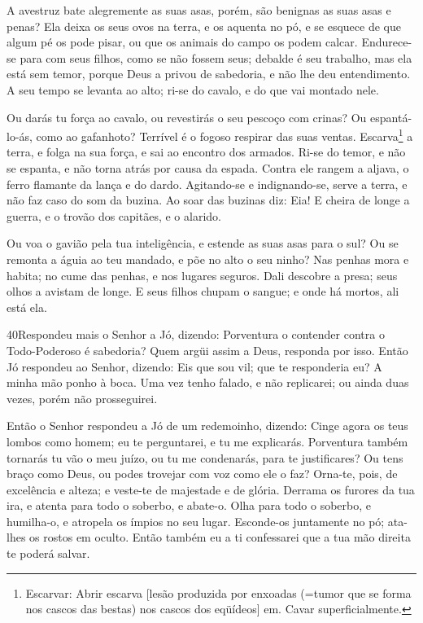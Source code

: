 A avestruz bate alegremente as suas asas, porém, são benignas as
suas asas e penas? Ela deixa os seus ovos na terra, e os
aquenta no pó, e se esquece de que algum pé os pode pisar, ou
que os animais do campo os podem calcar. Endurece-se para com
seus filhos, como se não fossem seus; debalde é seu trabalho, mas
ela está sem temor, porque Deus a privou de sabedoria, e não
lhe deu entendimento. A seu tempo se levanta ao alto; ri-se
do cavalo, e do que vai montado nele.

Ou darás tu força ao cavalo, ou revestirás o seu pescoço com
crinas? Ou espantá-lo-ás, como ao gafanhoto? Terrível é o
fogoso respirar das suas ventas. Escarva\footnote{Escarvar:
Abrir escarva [lesão produzida por enxoadas (=tumor que se forma nos
cascos das bestas) nos cascos dos eqüídeos] em. Cavar
superficialmente.} a terra, e folga na sua força, e sai ao encontro
dos armados. Ri-se do temor, e não se espanta, e não torna
atrás por causa da espada. Contra ele rangem a aljava, o
ferro flamante da lança e do dardo. Agitando-se e
indignando-se, serve a terra, e não faz caso do som da buzina.
Ao soar das buzinas diz: Eia! E cheira de longe a guerra, e o
trovão dos capitães, e o alarido.

Ou voa o gavião pela tua inteligência, e estende as suas asas
para o sul? Ou se remonta a águia ao teu mandado, e põe no
alto o seu ninho? Nas penhas mora e habita; no cume das
penhas, e nos lugares seguros. Dali descobre a presa; seus
olhos a avistam de longe. E seus filhos chupam o sangue; e
onde há mortos, ali está ela.

\medskip

\lettrine{40} Respondeu mais o Senhor a Jó, dizendo:
Porventura o contender contra o Todo-Poderoso é sabedoria? Quem
argüi assim a Deus, responda por isso. Então Jó respondeu ao
Senhor, dizendo: Eis que sou vil; que te responderia eu? A minha
mão ponho à boca. Uma vez tenho falado, e não replicarei; ou
ainda duas vezes, porém não prosseguirei.

Então o Senhor respondeu a Jó de um redemoinho, dizendo: Cinge
agora os teus lombos como homem; eu te perguntarei, e tu me
explicarás. Porventura também tornarás tu vão o meu juízo, ou tu
me condenarás, para te justificares? Ou tens braço como Deus, ou
podes trovejar com voz como ele o faz? Orna-te, pois, de
excelência e alteza; e veste-te de majestade e de glória.
Derrama os furores da tua ira, e atenta para todo o soberbo,
e abate-o. Olha para todo o soberbo, e humilha-o, e atropela
os ímpios no seu lugar. Esconde-os juntamente no pó; ata-lhes
os rostos em oculto. Então também eu a ti confessarei que a
tua mão direita te poderá salvar.

